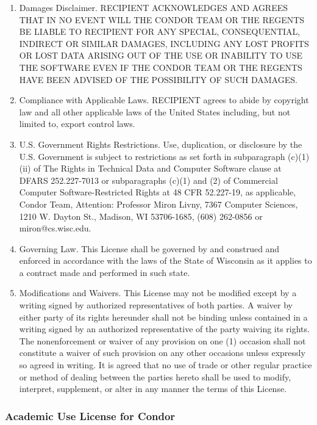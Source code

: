 \begin{enumerate}
\item Damages Disclaimer.  RECIPIENT ACKNOWLEDGES AND AGREES THAT IN
NO EVENT WILL THE CONDOR TEAM OR THE REGENTS BE LIABLE TO RECIPIENT
FOR ANY SPECIAL, CONSEQUENTIAL, INDIRECT OR SIMILAR DAMAGES, INCLUDING
ANY LOST PROFITS OR LOST DATA ARISING OUT OF THE USE OR INABILITY TO
USE THE SOFTWARE EVEN IF THE CONDOR TEAM OR THE REGENTS HAVE BEEN
ADVISED OF THE POSSIBILITY OF SUCH DAMAGES.

\item Compliance with Applicable Laws.  RECIPIENT agrees to abide by
copyright law and all other applicable laws of the United States
including, but not limited to, export control laws.

\item U.S. Government Rights Restrictions.  Use, duplication, or
disclosure by the U.S. Government is subject to restrictions as set
forth in subparagraph (c)(1)(ii) of The Rights in Technical Data and
Computer Software clause at DFARS 252.227-7013 or subparagraphs (c)(1)
and (2) of Commercial Computer Software-Restricted Rights at 48 CFR
52.227-19, as applicable, Condor Team, Attention: Professor Miron
Livny, 7367 Computer Sciences, 1210 W. Dayton St., Madison, WI
53706-1685, (608) 262-0856 or miron@cs.wisc.edu.

\item Governing Law.  This License shall be governed by and construed
and enforced in accordance with the laws of the State of Wisconsin as
it applies to a contract made and performed in such state.

\item Modifications and Waivers.  This License may not be modified
except by a writing signed by authorized representatives of both
parties.  A waiver by either party of its rights hereunder shall not
be binding unless contained in a writing signed by an authorized
representative of the party waiving its rights.  The nonenforcement or
waiver of any provision on one (1) occasion shall not constitute a
waiver of such provision on any other occasions unless expressly so
agreed in writing.  It is agreed that no use of trade or other regular
practice or method of dealing between the parties hereto shall be used
to modify, interpret, supplement, or alter in any manner the terms of
this License.

\end{enumerate}

\subsubsection{\label{Academic-Use-License}
Academic Use License for Condor}

